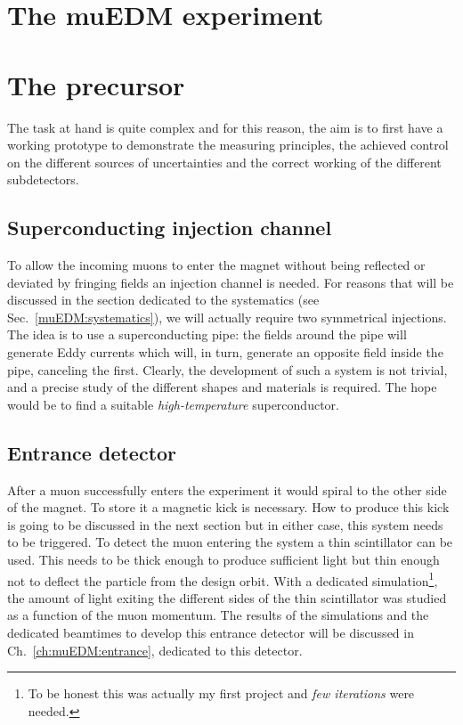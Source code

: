 \begin{refsection}
\section{The muEDM experiment}

\section{The precursor}
    The task at hand is quite complex and for this reason, the aim is to first have a working prototype to demonstrate the measuring principles, the achieved control on the different sources of uncertainties and the correct working of the different subdetectors.
    
    \subsection{Superconducting injection channel}
        To allow the incoming muons to enter the magnet without being reflected or deviated by fringing fields an injection channel is needed.
        For reasons that will be discussed in the section dedicated to the systematics (see Sec.~\ref{muEDM:systematics}), we will actually require two symmetrical injections.
        The idea is to use a superconducting pipe: the fields around the pipe will generate Eddy currents which will, in turn, generate an opposite field inside the pipe, canceling the first.
        Clearly, the development of such a system is not trivial, and a precise study of the different shapes and materials is required. 
        The hope would be to find a suitable \textit{high-temperature} superconductor.

    \subsection{Entrance detector} 
        After a muon successfully enters the experiment it would spiral to the other side of the magnet. 
        To store it a magnetic kick is necessary. 
        How to produce this kick is going to be discussed in the next section but in either case, this system needs to be triggered.
        To detect the muon entering the system a thin scintillator can be used.
        This needs to be thick enough to produce sufficient light but thin enough not to deflect the particle from the design orbit.
        With a dedicated \gf simulation\footnote{To be honest this was actually my first \gf project and \textit{few iterations} were needed.}, the amount of light exiting the different sides of the thin scintillator was studied as a function of the muon momentum. 
        The results of the simulations and the dedicated beamtimes to develop this entrance detector will be discussed in Ch.~\ref{ch:muEDM:entrance}, dedicated to this detector.


\end{refsection}
